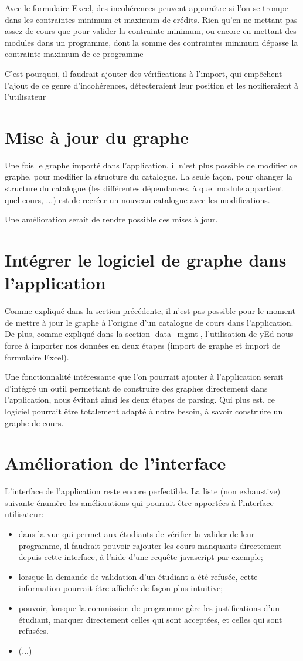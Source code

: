 Avec le formulaire Excel, des incohérences peuvent apparaître si l'on se trompe dans les contraintes minimum et maximum de crédits. Rien qu'en ne mettant pas assez de cours que pour valider la contrainte minimum, ou encore en mettant des modules dans un programme, dont la somme des contraintes minimum dépasse la contrainte maximum de ce programme

C'est pourquoi, il faudrait ajouter des vérifications à l'import, qui empêchent l'ajout de ce genre d'incohérences, détecteraient leur position et les notifieraient  à l'utilisateur

\section{Mise à jour du graphe}
Une fois le graphe importé dans l'application, il n'est plus possible de modifier ce graphe, pour modifier la structure du catalogue. La seule façon, pour changer la structure du catalogue (les différentes dépendances, à quel module appartient quel cours, ...) est de recréer un nouveau catalogue avec les modifications.

Une amélioration serait de rendre possible ces mises à jour.

\section{Intégrer le logiciel de graphe dans l'application}
Comme expliqué dans la section précédente, il n'est pas possible pour le moment de mettre à jour le graphe à l'origine d'un catalogue de cours dans l'application. De plus, comme expliqué dans la section \ref{data_mgmt}, l'utilisation de yEd nous force à importer nos données en deux étapes (import de graphe et import de formulaire Excel).

Une fonctionnalité intéressante que l'on pourrait ajouter à l'application serait d'intégré un outil permettant de construire des graphes directement dans l'application, nous évitant ainsi les deux étapes de parsing. Qui plus est, ce logiciel pourrait être totalement adapté à notre besoin, à savoir construire un graphe de cours.    
\section{Amélioration de l'interface} 
L'interface de l'application reste encore perfectible. La liste (non exhaustive) suivante énumère les améliorations qui pourrait être apportées à l'interface utilisateur:
\begin{itemize}
\item dans la vue qui permet aux étudiants de vérifier la valider de leur programme, il faudrait pouvoir rajouter les cours manquants directement depuis cette interface, à l'aide d'une requête javascript par exemple;
\item lorsque la demande de validation d'un étudiant a été refusée, cette information pourrait être affichée de façon plus intuitive;
\item pouvoir, lorsque la commission de programme gère les justifications d'un étudiant, marquer directement celles qui sont acceptées, et celles qui sont refusées.
\item (...)
\end{itemize}
